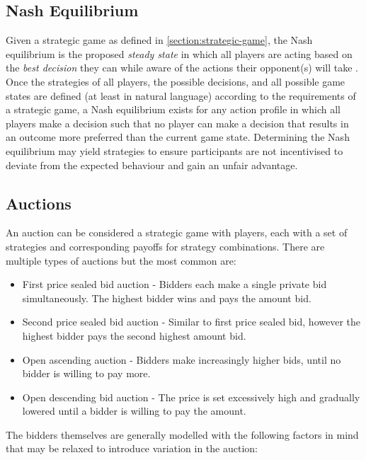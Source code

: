 \subsection{Nash Equilibrium} \label{section:nash}

Given a strategic game as defined in \cref{section:strategic-game}, the Nash equilibrium is the proposed \textit{steady state} in which all players are acting based on the \textit{best decision} they can while aware of the actions their opponent(s) will take \cite[Section 2.2]{osborne1994}. Once the strategies of all players, the possible decisions, and all possible game states are defined (at least in natural language) according to the requirements of a strategic game, a Nash equilibrium exists for any action profile in which all players make a decision such that no player can make a decision that results in an outcome more preferred than the current game state. Determining the Nash equilibrium may yield strategies to ensure participants are not incentivised to deviate from the expected behaviour and gain an unfair advantage. 

\subsection{Auctions} \label{section:auctions}

An auction can be considered a strategic game with players, each with a set of strategies and corresponding payoffs for strategy combinations. There are multiple types of auctions \cite{auctions1987} but the most common are:

\begin{itemize}
    \item First price sealed bid auction - Bidders each make a single private bid simultaneously. The highest bidder wins and pays the amount bid.
    \item Second price sealed bid auction - Similar to first price sealed bid, however the highest bidder pays the second highest amount bid.
    \item Open ascending auction - Bidders make increasingly higher bids, until no bidder is willing to pay more.
    \item Open descending bid auction - The price is set excessively high and gradually lowered until a bidder is willing to pay the amount.
\end{itemize}

The bidders themselves are generally modelled with the following factors in mind that may be relaxed to introduce variation in the auction:

